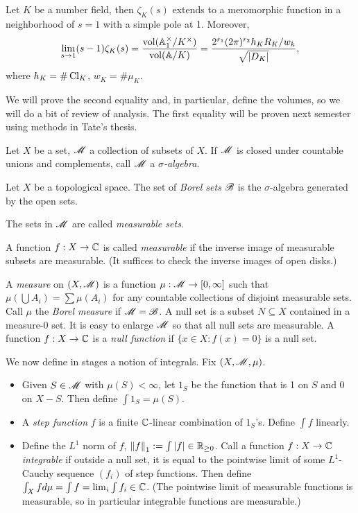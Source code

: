 \documentclass[11pt]{amsart}
\begin{document}
\begin{thm}
    Let $K$ be a number field, then $\zeta_K(s)$ extends to a meromorphic function in a neighborhood of $s=1$ with a simple pole at 1. Moreover,
    \[\lim_{s\to 1} (s-1)\zeta_K(s) = \frac{\operatorname{vol}(\mathbb{A}_1^\times/K^\times)}{\operatorname{vol}(\mathbb{A}/K)} = \frac{2^{r_1}(2\pi)^{r_2}h_KR_K/w_k}{\sqrt{|D_K|}},\]
    where $h_K = \#\operatorname{Cl}_K$, $w_K = \# \mu_K$.
\end{thm}

We will prove the second equality and, in particular, define the volumes, so we will do a bit of review of analysis. The first equality will be proven next semester using methods in Tate's thesis.


\begin{defn}
    Let $X$ be a set, $\mathscr{M}$ a collection of subsets of $X$. If $\mathscr{M}$ is closed under countable unions and complements, call $\mathscr{M}$ a \emph{$\sigma$-algebra}.
\end{defn}

\begin{exm}
    Let $X$ be a topological space. The set of \emph{Borel sets} $\mathscr{B}$ is the $\sigma$-algebra generated by the open sets.
\end{exm}

The sets in $\mathscr{M}$ are called \emph{measurable sets}.

\begin{defn}
    A function $f:X\to \mathbb{C}$ is called \emph{measurable} if the inverse image of measurable subsets are measurable. (It suffices to check the inverse images of open disks.)
\end{defn}

\begin{defn}
    A \emph{measure} on $(X,\mathscr{M})$ is a function $\mu:\mathscr{M}\to [0,\infty]$ such that $\mu(\bigcup A_i) = \sum \mu(A_i)$ for any countable collections of disjoint measurable sets. Call $\mu$ the \emph{Borel measure} if $\mathscr{M} = \mathscr{B}$. A null set is a subset $N\subseteq X$ contained in a measure-0 set. It is easy to enlarge $\mathscr{M}$ so that all null sets are measurable. A function $f:X\to \mathbb{C}$ is a \emph{null function} if $\{x\in X: f(x)=0\}$ is a null set.
\end{defn}

We now define in stages a notion of integrals. Fix $(X,\mathscr{M}, \mu)$.
\begin{itemize}
    \item Given $S\in \mathscr{M}$ with $\mu(S) < \infty$, let $1_S$ be the function that is 1 on $S$ and 0 on $X-S$. Then define $\int 1_S = \mu(S)$. 
    \item A \emph{step function} $f$ is a finite $\mathbb{C}$-linear combination of $1_S$'s. Define $\int f$ linearly.
    \item Define the $L^1$ norm of $f$, $\left\| f \right\|_1 := \int |f| \in \mathbb{R}_{\ge 0}$. Call a function $f:X\to \mathbb{C}$ \emph{integrable} if outside a null set, it is equal to the pointwise limit of some $L^1$-Cauchy sequence $(f_i)$ of step functions. Then define $\int_X fd\mu = \int f = \lim_i \int f_i \in \mathbb{C}$. (The pointwise limit of measurable functions is measurable, so in particular integrable functions are measurable.)
\end{itemize}
\end{document}
